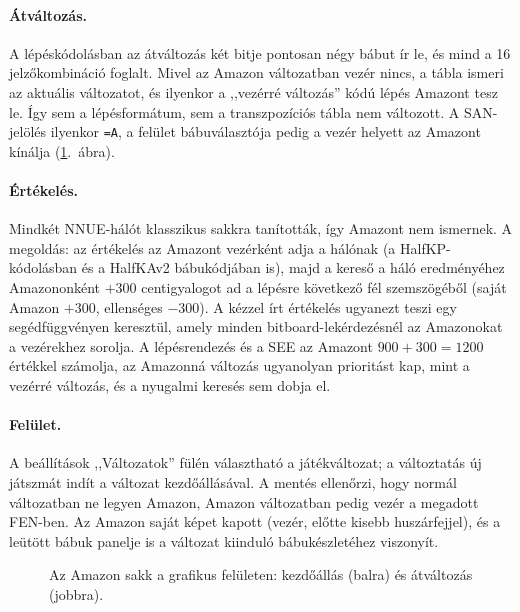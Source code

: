 \paragraph{Átváltozás.} A lépéskódolásban az átváltozás két bitje pontosan négy bábut ír le, és mind a 16 jelzőkombináció foglalt. Mivel az Amazon változatban vezér nincs, a tábla ismeri az aktuális változatot, és ilyenkor a ,,vezérré változás'' kódú lépés Amazont tesz le. Így sem a lépésformátum, sem a transzpozíciós tábla nem változott. A SAN-jelölés ilyenkor \texttt{=A}, a felület bábuválasztója pedig a vezér helyett az Amazont kínálja (\ref{fig:amazonGui}.~ábra).

\paragraph{Értékelés.} Mindkét NNUE-hálót klasszikus sakkra tanították, így Amazont nem ismernek. A megoldás: az értékelés az Amazont vezérként adja a hálónak (a HalfKP-kódolásban és a HalfKAv2 bábukódjában is), majd a kereső a háló eredményéhez Amazononként $+300$ centigyalogot ad a lépésre következő fél szemszögéből (saját Amazon $+300$, ellenséges $-300$). A kézzel írt értékelés ugyanezt teszi egy segédfüggvényen keresztül, amely minden bitboard-lekérdezésnél az Amazonokat a vezérekhez sorolja. A lépésrendezés és a SEE az Amazont $900+300=1200$ értékkel számolja, az Amazonná változás ugyanolyan prioritást kap, mint a vezérré változás, és a nyugalmi keresés sem dobja el.

\paragraph{Felület.} A beállítások ,,Változatok'' fülén választható a játékváltozat; a változtatás új játszmát indít a változat kezdőállásával. A mentés ellenőrzi, hogy normál változatban ne legyen Amazon, Amazon változatban pedig vezér a megadott FEN-ben. Az Amazon saját képet kapott (vezér, előtte kisebb huszárfejjel), és a leütött bábuk panelje is a változat kiinduló bábukészletéhez viszonyít.

\begin{figure}[!ht]
	\centering
	\hspace{4mm}
	\caption{Az Amazon sakk a grafikus felületen: kezdőállás (balra) és átváltozás (jobbra).}
	\label{fig:amazonGui}
\end{figure}

